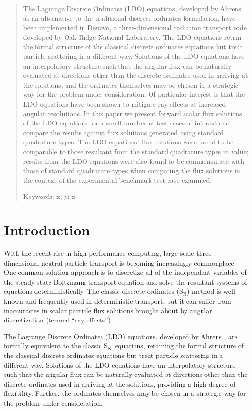 \documentclass{article} %
\newcommand{\sn}{S$_\mathrm{N}$}
\begin{document}
\begin{abstract}
{
The Lagrange Discrete Ordinates (LDO) equations, developed by Ahrens as an
alternative to the traditional discrete ordinates formulation, have been
implemented in Denovo, a three-dimensional radiation transport code developed
by Oak Ridge National Laboratory. The LDO equations retain the formal structure
of the classical discrete ordinates equations but treat particle scattering
in a different way. Solutions of the LDO equations have an interpolatory
structure such that the angular flux can be naturally evaluated at directions
other than the discrete ordinates used in arriving at the solutions, and the
ordinates themselves may be chosen in a strategic way for the problem
under consideration. Of particular interest is that the LDO equations have been
shown to mitigate ray effects at increased angular resolutions. In this paper
we present forward scalar flux solutions of the LDO equations for a small
number of test cases of interest and compare the results against flux solutions
generated using standard quadrature types. The LDO equations' flux solutions
were found to be comparable to those resultant from the standard quadrature
types in value; results from the LDO equations were also found to be
commensurate with those of standard quadrature types when comparing the flux
solutions in the context of the experimental benchmark test case examined.

Keywords: x; y; z
}
\end{abstract}

\pagebreak

\section{Introduction}
\label{sec:intro}

With the recent rise in high-performance computing, large-scale 
three-dimensional neutral particle transport is becoming increasingly
commonplace. One common solution approach is to discretize all of the
independent variables of the steady-state Boltzmann transport equation and
solve the resultant systems of equations deterministically. The classic discrete ordinates (\sn)
method is well-known and frequently used in deterministic transport, but it
can suffer from inaccuracies in scalar particle flux solutions
brought about by angular discretization (termed ``ray effects'').

The Lagrange Discrete Ordinates (LDO) equations, developed by Ahrens
\cite{ahrens}, are formally equivalent to the classic \sn\ equations, retaining the formal structure
of the classical discrete ordinates equations but treat particle scattering
in a different way. Solutions of the LDO equations have an interpolatory
structure such that the angular flux can be naturally evaluated at directions
other than the discrete ordinates used in arriving at the solutions, providing a high degree of flexibility.
Further, the
ordinates themselves may be chosen in a strategic way for the problem
under consideration. 
\end{document}
